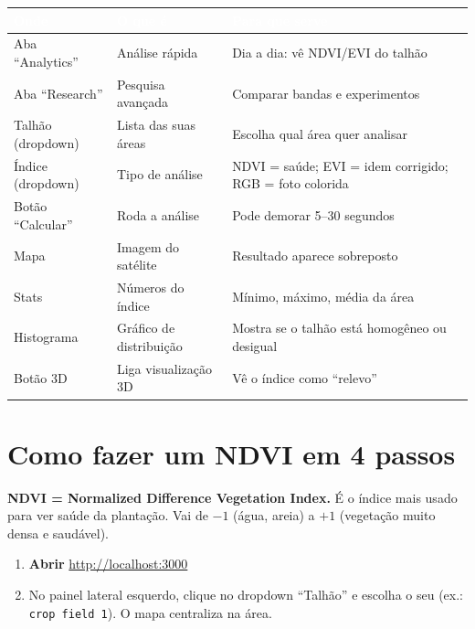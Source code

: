\documentclass[11pt, a4paper]{article}
\begin{document}
\renewcommand{\arraystretch}{1.3}
\begin{table}[H]
\centering
\small
{}
\begin{tabularx}{\textwidth}{@{}lll@{}}
\toprule
\rowcolor{tabheader}\textcolor{white}{\textbf{Onde}} & \textcolor{white}{\textbf{O que é}} & \textcolor{white}{\textbf{Para que serve}}\\
\midrule
Aba ``Analytics'' & Análise rápida & Dia a dia: vê NDVI/EVI do talhão\\
Aba ``Research'' & Pesquisa avançada & Comparar bandas e experimentos\\
Talhão (dropdown) & Lista das suas áreas & Escolha qual área quer analisar\\
Índice (dropdown) & Tipo de análise & NDVI = saúde; EVI = idem corrigido; RGB = foto colorida\\
Botão ``Calcular'' & Roda a análise & Pode demorar 5--30 segundos\\
Mapa & Imagem do satélite & Resultado aparece sobreposto\\
Stats & Números do índice & Mínimo, máximo, média da área\\
Histograma & Gráfico de distribuição & Mostra se o talhão está homogêneo ou desigual\\
Botão 3D & Liga visualização 3D & Vê o índice como ``relevo''\\
\bottomrule
\end{tabularx}
\end{table}

\section{Como fazer um NDVI em 4 passos}

\begin{infobox}
\textbf{NDVI = Normalized Difference Vegetation Index.} É o índice mais usado para ver saúde da plantação. Vai de \textbf{$-1$} (água, areia) a \textbf{$+1$} (vegetação muito densa e saudável).
\end{infobox}

\begin{enumerate}
  \item \textbf{Abrir} \url{http://localhost:3000}
  \item No painel lateral esquerdo, clique no dropdown ``Talhão'' e escolha o seu (ex.: \texttt{crop field 1}). O mapa centraliza na área.
\end{enumerate}
\end{document}
